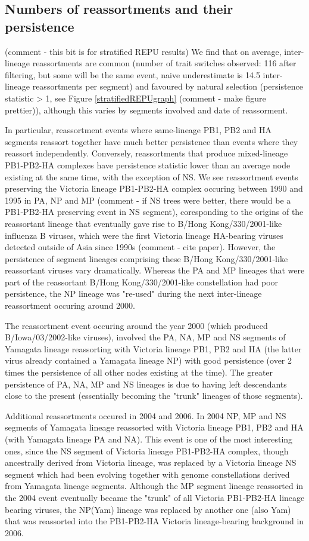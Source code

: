 \documentclass[11pt,oneside,letterpaper]{article}
\begin{document}
\subsection*{Numbers of reassortments and their persistence}

(comment - this bit is for stratified REPU results)
We find that on average, inter-lineage reassortments are common (number of trait switches observed: 116 after filtering, but some will be the same event, naive underestimate is 14.5 inter-lineage reassortments per segment) and favoured by natural selection (persistence statistic > 1, see Figure \ref{stratifiedREPUgraph} (comment - make figure prettier)), although this varies by segments involved and date of reassorment.

In particular, reassortment events where same-lineage PB1, PB2 and HA segments reassort together have much better persistence than events where they reassort independently.
Conversely, reassortments that produce mixed-lineage PB1-PB2-HA complexes have persistence statistic lower than an average node existing at the same time, with the exception of NS.
We see reassortment events preserving the Victoria lineage PB1-PB2-HA complex occuring between 1990 and 1995 in PA, NP and MP (comment - if NS trees were better, there would be a PB1-PB2-HA preserving event in NS segment), coresponding to the origins of the reassortant lineage that eventually gave rise to B/Hong Kong/330/2001-like influenza B viruses, which were the first Victoria lineage HA-bearing viruses detected outside of Asia since 1990s (comment - cite paper).
However, the persistence of segment lineages comprising these B/Hong Kong/330/2001-like reassortant viruses vary dramatically.
Whereas the PA and MP lineages that were part of the reassortant B/Hong Kong/330/2001-like constellation had poor persistence, the NP lineage was "re-used" during the next inter-lineage reassortment occuring around 2000.

The reassortment event occuring around the year 2000 (which produced B/Iowa/03/2002-like viruses), involved the PA, NA, MP and NS segments of Yamagata lineage reassorting with Victoria lineage PB1, PB2 and HA (the latter virus already contained a Yamagata lineage NP) with good persistence (over 2 times the persistence of all other nodes existing at the time).
The greater persistence of PA, NA, MP and NS lineages is due to having left descendants close to the present (essentially becoming the "trunk" lineages of those segments).

Additional reassortments occured in 2004 and 2006.
In 2004 NP, MP and NS segments of Yamagata lineage reassorted with Victoria lineage PB1, PB2 and HA (with Yamagata lineage PA and NA).
This event is one of the most interesting ones, since the NS segment of Victoria lineage PB1-PB2-HA complex, though ancestrally derived from Victoria lineage, was replaced by a Victoria lineage NS segment which had been evolving together with genome constellations derived from Yamagata lineage segments.
Although the MP segment lineage reassorted in the 2004 event eventually became the "trunk" of all Victoria PB1-PB2-HA lineage bearing viruses, the NP(Yam) lineage was replaced by another one (also Yam) that was reassorted into the PB1-PB2-HA Victoria lineage-bearing background in 2006.
\end{document}
